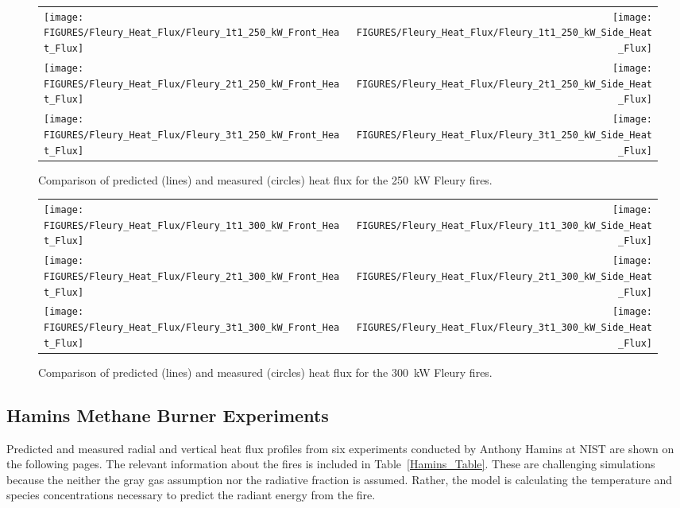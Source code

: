 \begin{figure}[p]
\begin{tabular*}{\textwidth}{l@{\extracolsep{\fill}}r}
\texttt{[image: FIGURES/Fleury\_Heat\_Flux/Fleury\_1t1\_250\_kW\_Front\_Heat\_Flux]} &
\texttt{[image: FIGURES/Fleury\_Heat\_Flux/Fleury\_1t1\_250\_kW\_Side\_Heat\_Flux]} \\
\texttt{[image: FIGURES/Fleury\_Heat\_Flux/Fleury\_2t1\_250\_kW\_Front\_Heat\_Flux]} &
\texttt{[image: FIGURES/Fleury\_Heat\_Flux/Fleury\_2t1\_250\_kW\_Side\_Heat\_Flux]} \\
\texttt{[image: FIGURES/Fleury\_Heat\_Flux/Fleury\_3t1\_250\_kW\_Front\_Heat\_Flux]} &
\texttt{[image: FIGURES/Fleury\_Heat\_Flux/Fleury\_3t1\_250\_kW\_Side\_Heat\_Flux]}
\end{tabular*}
\label{Fleury_Heat_Flux_250_kW}
\caption[Fleury Heat Flux, 250 kW fires.]
{Comparison of predicted (lines) and measured (circles) heat flux for the 250~kW Fleury fires.}
\end{figure}

\begin{figure}[p]
\begin{tabular*}{\textwidth}{l@{\extracolsep{\fill}}r}
\texttt{[image: FIGURES/Fleury\_Heat\_Flux/Fleury\_1t1\_300\_kW\_Front\_Heat\_Flux]} &
\texttt{[image: FIGURES/Fleury\_Heat\_Flux/Fleury\_1t1\_300\_kW\_Side\_Heat\_Flux]} \\
\texttt{[image: FIGURES/Fleury\_Heat\_Flux/Fleury\_2t1\_300\_kW\_Front\_Heat\_Flux]} &
\texttt{[image: FIGURES/Fleury\_Heat\_Flux/Fleury\_2t1\_300\_kW\_Side\_Heat\_Flux]} \\
\texttt{[image: FIGURES/Fleury\_Heat\_Flux/Fleury\_3t1\_300\_kW\_Front\_Heat\_Flux]} &
\texttt{[image: FIGURES/Fleury\_Heat\_Flux/Fleury\_3t1\_300\_kW\_Side\_Heat\_Flux]}
\end{tabular*}
\label{Fleury_Heat_Flux_300_kW}
\caption[Fleury Heat Flux, 300 kW fires.]
{Comparison of predicted (lines) and measured (circles) heat flux for the 300~kW Fleury fires.}
\end{figure}

\clearpage

\subsection{Hamins Methane Burner Experiments}

Predicted and measured radial and vertical heat flux profiles from six experiments conducted by Anthony Hamins at NIST are shown on the following pages. The relevant information about the fires is included in Table~\ref{Hamins_Table}. These are challenging simulations because the neither the gray gas assumption nor the radiative fraction is assumed. Rather, the model is calculating the temperature and species concentrations necessary to predict the radiant energy from the fire.

